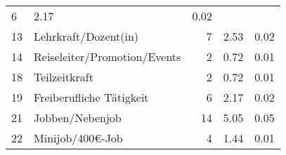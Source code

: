 \begin{longtable}{lXrrr}
       \num{6} &
       \num[round-mode=places,round-precision=2]{2,17} &
         \num[round-mode=places,round-precision=2]{0,02} \\

     13 &
     \multicolumn{1}{X}{ Lehrkraft/Dozent(in)   } &


       \num{7} &
       \num[round-mode=places,round-precision=2]{2,53} &
         \num[round-mode=places,round-precision=2]{0,02} \\

     14 &
     \multicolumn{1}{X}{ Reiseleiter/Promotion/Events   } &


       \num{2} &
       \num[round-mode=places,round-precision=2]{0,72} &
         \num[round-mode=places,round-precision=2]{0,01} \\

     18 &
     \multicolumn{1}{X}{ Teilzeitkraft   } &


       \num{2} &
       \num[round-mode=places,round-precision=2]{0,72} &
         \num[round-mode=places,round-precision=2]{0,01} \\

     19 &
     \multicolumn{1}{X}{ Freiberufliche Tätigkeit   } &


       \num{6} &
       \num[round-mode=places,round-precision=2]{2,17} &
         \num[round-mode=places,round-precision=2]{0,02} \\

     21 &
     \multicolumn{1}{X}{ Jobben/Nebenjob   } &


       \num{14} &
       \num[round-mode=places,round-precision=2]{5,05} &
         \num[round-mode=places,round-precision=2]{0,05} \\

     22 &
     \multicolumn{1}{X}{ Minijob/400€-Job   } &


       \num{4} &
       \num[round-mode=places,round-precision=2]{1,44} &
         \num[round-mode=places,round-precision=2]{0,01} \\


\end{longtable}
